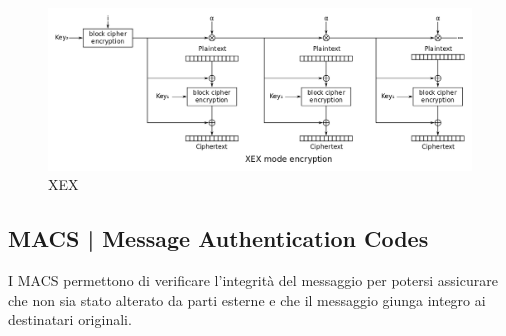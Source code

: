 
\textsf{\small }

\begin{figure}[H]
	\centering
	\includegraphics[width=1\textwidth, height=1\textheight, keepaspectratio]{./images/aes_modes/xex.png}
	\caption{XEX}
	\label{fig:xex}
\end{figure}


\subsection{MACS | Message Authentication Codes}




\textsf{\small I MACS permettono di verificare l'integrità del messaggio per potersi assicurare che non sia stato alterato da parti esterne e che il messaggio giunga integro ai destinatari originali.} %

